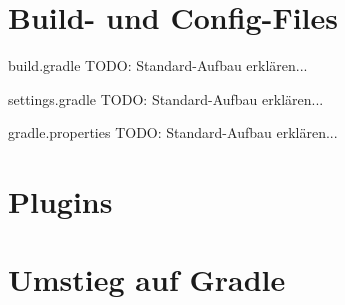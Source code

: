 \documentclass[newPxFont,numfooter,sectionpages]{beamer}
\begin{document}
\section{Build- und Config-Files}

\begin{frame}{build.gradle}
TODO: Standard-Aufbau erklären...
\end{frame}

\begin{frame}{settings.gradle}
TODO: Standard-Aufbau erklären...
\end{frame}

\begin{frame}{gradle.properties}
TODO: Standard-Aufbau erklären...
\end{frame}

\section{Plugins}

\section{Umstieg auf Gradle}
\end{document}
